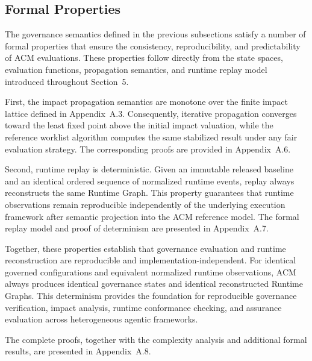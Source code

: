 \documentclass[10pt]{article}
\begin{document}
\subsection{Formal Properties}
\label{sec:formal_properties}

The governance semantics defined in the previous subsections satisfy a number of
formal properties that ensure the consistency, reproducibility, and
predictability of ACM evaluations. These properties follow directly from the
state spaces, evaluation functions, propagation semantics, and runtime replay
model introduced throughout Section~5.

First, the impact propagation semantics are monotone over the finite impact
lattice defined in Appendix~A.3. Consequently, iterative propagation converges
toward the least fixed point above the initial impact valuation, while the
reference worklist algorithm computes the same stabilized result under any fair
evaluation strategy. The corresponding proofs are provided in
Appendix~A.6.

Second, runtime replay is deterministic. Given an immutable released baseline
and an identical ordered sequence of normalized runtime events, replay always
reconstructs the same Runtime Graph. This property guarantees that runtime
observations remain reproducible independently of the underlying execution
framework after semantic projection into the ACM reference model. The formal
replay model and proof of determinism are presented in Appendix~A.7.

Together, these properties establish that governance evaluation and runtime
reconstruction are reproducible and implementation-independent. For identical
governed configurations and equivalent normalized runtime observations, ACM
always produces identical governance states and identical reconstructed Runtime
Graphs. This determinism provides the foundation for reproducible governance
verification, impact analysis, runtime conformance checking, and assurance
evaluation across heterogeneous agentic frameworks.

The complete proofs, together with the complexity analysis and additional formal
results, are presented in Appendix~A.8.
\end{document}

